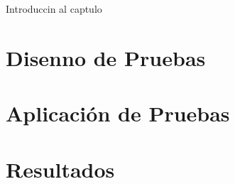 Introduccin al captulo

\section{Disenno de Pruebas}
\section{Aplicación de Pruebas}
\section{Resultados}